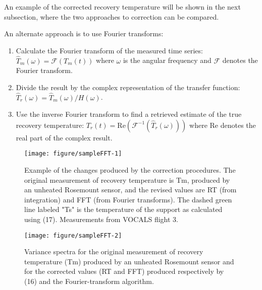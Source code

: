 \documentclass[11pt,twoside,american,12pt,twoside,american]{article}\usepackage[]{graphicx}\usepackage[]{color}
\makeatletter
\def\maxwidth{ %
  \ifdim\Gin@nat@width>\linewidth
    \linewidth
  \else
    \Gin@nat@width
  \fi
}
\newenvironment{knitrout}{}{} %
\makeatother
\begin{document}
An example of the corrected recovery temperature will be shown in
the next subsection, where the two approaches to correction can be
compared.

An alternate approach is to use Fourier transforms:
\begin{enumerate}
\item Calculate the Fourier transform of the measured time series: $\hat{T}_{m}(\omega)=\mathcal{F}\left(T_{m}(t)\right)$
where $\omega$ is the angular frequency and $\mathcal{F}$ denotes
the Fourier transform.
\item Divide the result by the complex representation of the transfer function:
$\hat{T}_{r}(\omega)=\hat{T}_{m}(\omega)/H(\omega)$.
\item Use the inverse Fourier transform to find a retrieved estimate of
the true recovery temperature: $T_{r}(t)=\mathrm{Re}\left(\mathcal{F}^{-1}\left(\hat{T}_{r}(\omega)\right)\right)$
where Re denotes the real part of the complex result.
\end{enumerate}


\begin{knitrout}
\color{fgcolor}\begin{figure}

{\centering \texttt{[image: figure/sampleFFT-1]} 

}

\caption[Example of the changes produced by the correction procedures]{Example of the changes produced by the correction procedures. The original measurement of recovery temperature is Tm, produced by an unheated Rosemount sensor, and the revised values are RT (from integration) and FFT (from Fourier transforms). The dashed green line labeled "Ts" is the temperature of the support as calculated using (17). Measurements from VOCALS flight 3.}\label{fig:sampleFFT1}
\end{figure}

\begin{figure}

{\centering \texttt{[image: figure/sampleFFT-2]} 

}

\caption[Variance spectra for the original measurement of recovery temperature (Tm) produced by an unheated Rosemount sensor and for the corrected values (RT and FFT) produced respectively by (16) and the Fourier-transform algorithm]{Variance spectra for the original measurement of recovery temperature (Tm) produced by an unheated Rosemount sensor and for the corrected values (RT and FFT) produced respectively by (16) and the Fourier-transform algorithm.}\label{fig:sampleFFT2}
\end{figure}


\end{knitrout}
\end{document}
